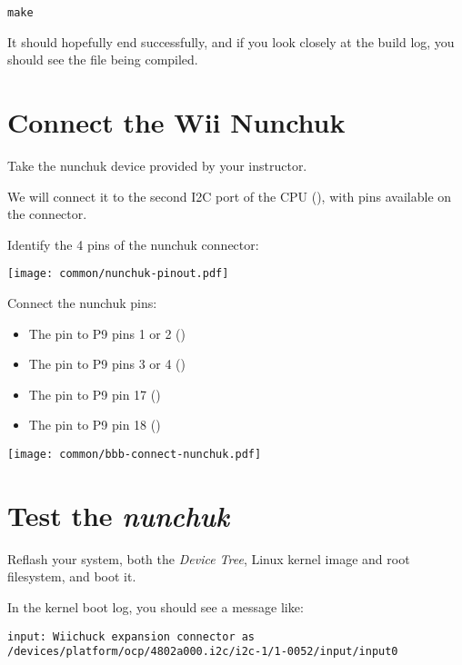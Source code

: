 \begin{verbatim}
make
\end{verbatim}

It should hopefully end successfully, and if you look closely at the
build log, you should see the file  being compiled.

\section{Connect the Wii Nunchuk}

Take the nunchuk device provided by your instructor.

We will connect it to the second I2C port of the CPU (),
with pins available on the  connector.

Identify the 4 pins of the nunchuk connector:

\begin{center}
\texttt{[image: common/nunchuk-pinout.pdf]}
\end{center}

Connect the nunchuk pins:
\begin{itemize}
\item The  pin to P9 pins 1 or 2 ()
\item The  pin to P9 pins 3 or 4 ()
\item The  pin to P9 pin 17 ()
\item The  pin to P9 pin 18 ()
\end{itemize}

\begin{center}
\texttt{[image: common/bbb-connect-nunchuk.pdf]}
\end{center}

\section{Test the {\em nunchuk}}

Reflash your system, both the {\em Device Tree}, Linux kernel image
and root filesystem, and boot it.

In the kernel boot log, you should see a message like:

\begin{verbatim}
input: Wiichuck expansion connector as /devices/platform/ocp/4802a000.i2c/i2c-1/1-0052/input/input0
\end{verbatim}

